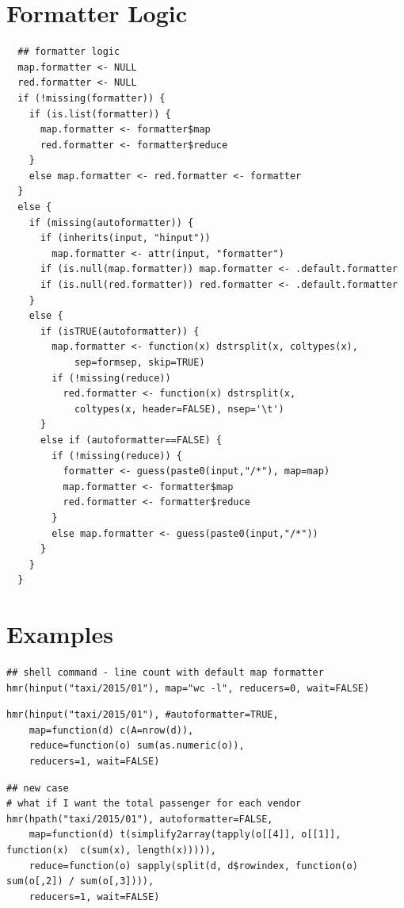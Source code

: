 \documentclass[11pt]{book}
\begin{document}
\section{Formatter Logic}

\begin{verbatim}
  ## formatter logic
  map.formatter <- NULL
  red.formatter <- NULL
  if (!missing(formatter)) {
    if (is.list(formatter)) {
      map.formatter <- formatter$map
      red.formatter <- formatter$reduce
    } 
    else map.formatter <- red.formatter <- formatter
  }
  else {
    if (missing(autoformatter)) {
      if (inherits(input, "hinput"))
        map.formatter <- attr(input, "formatter")
      if (is.null(map.formatter)) map.formatter <- .default.formatter
      if (is.null(red.formatter)) red.formatter <- .default.formatter
    }
    else {
      if (isTRUE(autoformatter)) {
        map.formatter <- function(x) dstrsplit(x, coltypes(x), 
        	sep=formsep, skip=TRUE)
        if (!missing(reduce)) 
          red.formatter <- function(x) dstrsplit(x, 
          	coltypes(x, header=FALSE), nsep='\t')
      }
      else if (autoformatter==FALSE) {
        if (!missing(reduce)) {
          formatter <- guess(paste0(input,"/*"), map=map)
          map.formatter <- formatter$map
          red.formatter <- formatter$reduce
        }
        else map.formatter <- guess(paste0(input,"/*"))
      }
    }
  }
  \end{verbatim}



\section{Examples}

\begin{verbatim}
## shell command - line count with default map formatter
hmr(hinput("taxi/2015/01"), map="wc -l", reducers=0, wait=FALSE)
\end{verbatim}

\begin{verbatim}
hmr(hinput("taxi/2015/01"), #autoformatter=TRUE,
    map=function(d) c(A=nrow(d)),
    reduce=function(o) sum(as.numeric(o)),
    reducers=1, wait=FALSE)
\end{verbatim}

\begin{verbatim}
## new case
# what if I want the total passenger for each vendor
hmr(hpath("taxi/2015/01"), autoformatter=FALSE,
    map=function(d) t(simplify2array(tapply(o[[4]], o[[1]], function(x)  c(sum(x), length(x))))),
    reduce=function(o) sapply(split(d, d$rowindex, function(o) sum(o[,2]) / sum(o[,3]))),
    reducers=1, wait=FALSE)
\end{verbatim}
\end{document}
